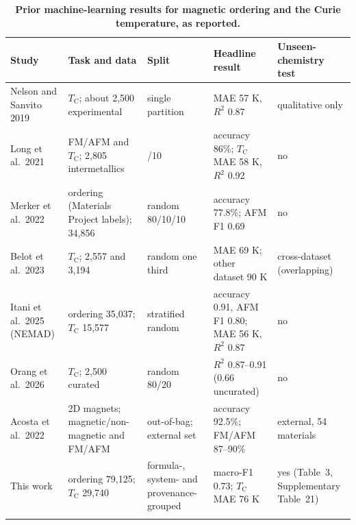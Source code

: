\documentclass[pdflatex,sn-nature]{sn-jnl}
\newcommand{\Tc}{\ensuremath{T_\mathrm{C}}}
\begin{document}
\begin{table}[!ht]
\caption{\textbf{Prior machine-learning results for magnetic ordering and the Curie temperature, as reported.}}\label{tab:s9}%
\setlength{\tabcolsep}{4pt}%
\begin{tabular}{@{}>{\raggedright\arraybackslash}p{62pt}>{\raggedright\arraybackslash}p{78pt}>{\raggedright\arraybackslash}p{56pt}>{\raggedright\arraybackslash}p{92pt}>{\raggedright\arraybackslash}p{52pt}@{}}
\toprule
Study & Task and data & Split & Headline result & Unseen-chemistry test \\
\midrule
Nelson and Sanvito 2019\cite{nelson2019curie} & \Tc{}; about 2,500 experimental & single partition & MAE 57 K, $R^2$ 0.87 & qualitative only \\[2pt]
Long et al.\ 2021\cite{long2021ferro} & FM/AFM and \Tc{}; 2,805 intermetallics & 90/10 & accuracy 86\%; \Tc{} MAE 58 K, $R^2$ 0.92 & no \\[2pt]
Merker et al.\ 2022\cite{merker2022classifiers} & ordering (Materials Project labels); 34,856 & random 80/10/10 & accuracy 77.8\%; AFM F1 0.69 & no \\[2pt]
Belot et al.\ 2023\cite{belot2023curie} & \Tc{}; 2,557 and 3,194 & random one third & MAE 69 K; other dataset 90 K & cross-dataset (overlapping) \\[2pt]
Itani et al.\ 2025 (NEMAD)\cite{itani2025nemad} & ordering 35,037; \Tc{} 15,577 & stratified random & accuracy 0.91, AFM F1 0.80; MAE 56 K, $R^2$ 0.87 & no \\[2pt]
Orang et al.\ 2026\cite{abediorang2026curie} & \Tc{}; 2,500 curated & random 80/20 & $R^2$ 0.87--0.91 (0.66 uncurated) & no \\[2pt]
Acosta et al.\ 2022\cite{acosta2022ordering2d} & 2D magnets; magnetic/non-magnetic and FM/AFM & out-of-bag; external set & accuracy 92.5\%; FM/AFM 87--90\% & external, 54 materials \\[2pt]
This work & ordering 79,125; \Tc{} 29,740 & formula-, system- and provenance-grouped & macro-F1 0.73; \Tc{} MAE 76 K & yes (Table~3, Supplementary Table~21) \\
\botrule
\end{tabular}
\end{table}
\end{document}
